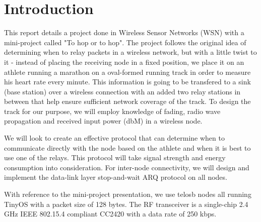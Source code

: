 \chapter{Introduction}\label{ch:introduction}

This report details a project done in Wireless Sensor Networks (WSN) with a mini-project called "To hop or to hop". The project follows the original idea of determining when to relay packets in a wireless network, but with a little twist to it - instead of placing the receiving node in a fixed position, we place it on an athlete running a marathon on a oval-formed running track in order to measure his heart rate every minute. This information is going to be transfered to a sink (base station) over a wireless connection with an added two relay stations in between that help ensure sufficient network coverage of the track. To design the track for our purpose, we will employ knowledge of fading, radio wave propagation and received input power (dbM) in a wireless node.

\noindent We will look to create an effective protocol that can determine when to communicate directly with the node based on the athlete and when it is best to use one of the relays. This protocol will take signal strength and energy consumption into consideration. For inter-node connectivity, we will design and implement the data-link layer stop-and-wait ARQ protocol on all nodes.

\noindent With reference to the mini-project presentation, we use telosb nodes all running TinyOS with a packet size of 128 bytes. The RF transceiver is a single-chip 2.4 GHz IEEE 802.15.4 compliant CC2420 with a data rate of 250 kbps.


